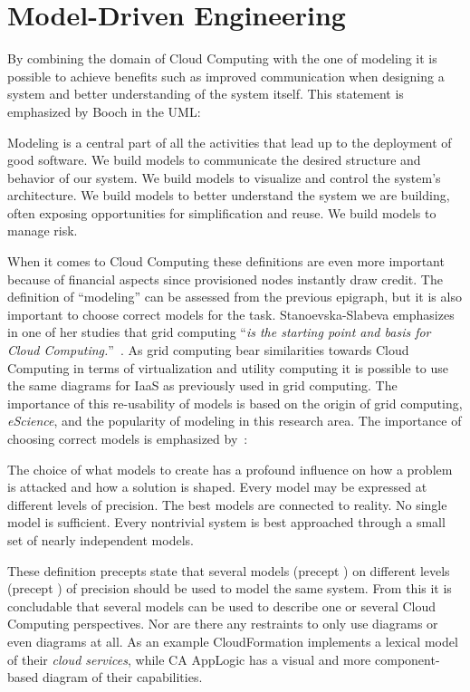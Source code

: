 \section{Model-Driven Engineering}

By combining the domain of Cloud Computing with the one of modeling 
it is possible to achieve benefits such as improved communication when designing 
a system and better understanding of the system itself.
This statement is emphasized by Booch \etal in the UML:
\epigraph{
  Modeling is a central
  part of all the activities that lead up to the deployment of good
  software. We build models to communicate the desired structure and
  behavior of our system. We build models to visualize and control the
  system's architecture. We build models to better understand the
  system we are building, often exposing opportunities for
  simplification and reuse. We build models to manage risk.
}{\cite{unified:booch05}}
When it comes to Cloud Computing these definitions are even more important
because of financial aspects since provisioned nodes instantly draw credit.
The definition of ``modeling'' can be assessed from the previous epigraph, but it is 
also important to choose correct models for the task.
Stanoevska-Slabeva emphasizes in one of her studies that grid computing
``\emph{is the starting point and basis for Cloud Computing.}''~\cite{introduction:wozniak10}.
As grid computing bear similarities towards Cloud Computing in terms of virtualization 
and utility computing
it is possible to use the same  diagrams for IaaS as previously used in grid computing.
The importance of this re-usability of models is based on the origin of grid computing, 
\emph{eScience},
and the popularity of modeling in this research area.
The importance of choosing correct models is emphasized by~\cite{unified:booch05}:
\epigraph{
  \begin{ii}\iitem The choice
  of what models to create has a profound influence on how a problem
  is attacked and how a solution is shaped. \iitem Every model may be
  expressed at different levels of precision. \iitem The best models
  are connected to reality. \iitem No single model is
  sufficient. Every nontrivial system is best approached through a
  small set of nearly independent models.\end{ii}
}{\cite{unified:booch05}}
These definition precepts state that several models (precept ) on different levels (precept ) 
of precision should be used to model the same system.
From this it is concludable that several models can be used to describe one or several Cloud Computing perspectives.
Nor are there any restraints to only use  diagrams or even diagrams at all.
As an example  CloudFormation implements a lexical model of their \emph{cloud services},
while CA AppLogic has a visual and more  component-based diagram of their capabilities.

